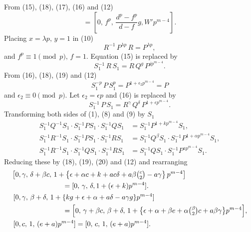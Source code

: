 \documentclass[oneside]{article}
\begin{document}
From (15), (18), (17), (16) and (12)
\begin{equation*}
[-p,\, 1,\, 0,\, 0,\, p] = \left[0,\, f^p,\, \frac{d^p - f^p}{d - f}g, W'p^{m-4}\right].
\end{equation*}
\noindent Placing $x = \lambda p,\, y = 1$ in (10)
\begin{equation*}
R^{-1}\, P^{\lambda p}\, R = P^{\lambda p},
\end{equation*}
\noindent and $f^p \equiv 1 \pmod{p},\, f = 1$. Equation (15) is replaced by
\begin{equation}
S{}_1^{-1}\, R\, S_1 = R\, Q^g\, P^{jp^{m-4}}. %
\end{equation}
\noindent From (16), (18), (19) and (12)
\begin{equation*}
S{}_1^{-p}\, P\, S{}_1^p = P^{1 + \epsilon_2 p^{m-4}} = P
\end{equation*}
\noindent and $\epsilon_2 \equiv 0 \pmod{p}$. Let $\epsilon_2 = \epsilon p$ and (16)
is replaced by
\begin{equation}
S{}_1^{-1}\, P\, S_1 = R^\gamma\, Q^\delta\, P^{1 + \epsilon p^{m-4}}. %
\end{equation}
\noindent Transforming both sides of (1), (8) and (9) by $S_1$
\begin{align*}
S{}_1^{-1} Q^{-1} S_1 \cdot S{}_1^{-1} P S_1 \cdot S{}_1^{-1} Q S_1 &=
  S{}_1^{-1} P^{1 + kp^{m-4}} S_1, \\
S{}_1^{-1} R^{-1} S_1 \cdot S{}_1^{-1} P S_1 \cdot S{}_1^{-1} R S_1 &=
  S{}_1^{-1} Q^\beta S_1 \cdot S{}_1^{-1} P^{1 + \alpha p^{m-4}} S_1, \\
S{}_1^{-1} R^{-1} S_1 \cdot S{}_1^{-1} Q S_1 \cdot S{}_1^{-1} R S_1 &=
  S{}_1^{-1} Q S_1 \cdot S{}_1^{-1} P^{ap^{m-4}} S_1.
\end{align*}
\noindent Reducing these by (18), (19), (20) and (12) and rearranging
\begin{align*}
\bigl[0,&\, \gamma,\, \delta + \beta c,\, 1 + \left \{ \epsilon + \alpha c + k + ac\delta +
    a\beta\tbinom{c}{2} - a\gamma \right \} p^{m-4} \bigr] \\
  & \qquad \qquad \qquad = [0,\, \gamma,\, \delta, 1 + (\epsilon + k)p^{m-4}]. \\
[0,&\, \gamma,\, \beta + \delta,\, 1 + \{kg + \epsilon + \alpha + a\delta -
    a\gamma g\}p^{m-4}] \\
  & \qquad \qquad \qquad = \Bigl[0,\, \gamma + \beta c,\, \beta + \delta,\, 1
    + \bigl\{\epsilon + \alpha + \beta e + \alpha\tbinom{\beta}{2}c
    + a\beta\gamma\bigr\}p^{m-4}\Bigr], \\
[0,&\, c,\, 1,\, (e + a)p^{m-4}] = [0,\, c,\, 1,\, (e + a)p^{m-4}].
\end{align*}
\end{document}
